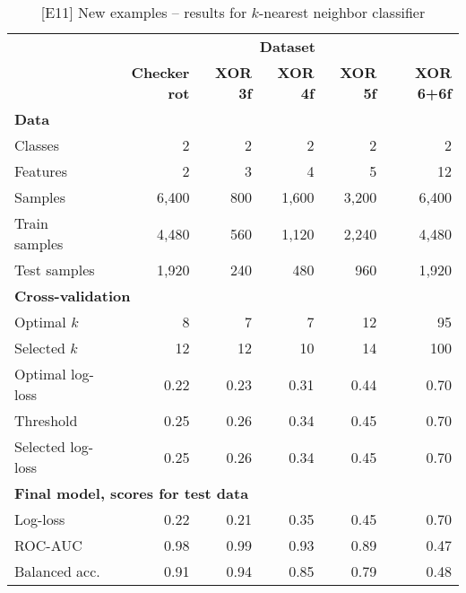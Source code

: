 %
\begin{table}
\caption{[E11]  New examples -- results for $k$-nearest neighbor classifier}
\label{tab_e11}
%
\begin{center}
\small
\begin{tabular}{|lrrrrr|}
\hline
&\multicolumn{5}{c|}{\textbf{\hrulefill\ Dataset \hrulefill}}\\
&\textbf{Checker rot}&\textbf{XOR 3f}&\textbf{XOR 4f}&\textbf{XOR 5f}&\textbf{XOR 6+6f}\\
\multicolumn{6}{|l|}{\textbf{Data}}\\
Classes&2&2&2&2&2\\
Features&2&3&4&5&12\\
Samples&6,400&800&1,600&3,200&6,400\\
Train samples&4,480&560&1,120&2,240&4,480\\
Test samples&1,920&240&480&960&1,920\\
\multicolumn{6}{|l|}{\textbf{Cross-validation}}\\
Optimal $k$&8&7&7&12&95\\
Selected $k$&12&12&10&14&100\\
Optimal log-loss&0.22&0.23&0.31&0.44&0.70\\
Threshold&0.25&0.26&0.34&0.45&0.70\\
Selected log-loss&0.25&0.26&0.34&0.45&0.70\\
\multicolumn{6}{|l|}{\textbf{Final model, scores for test data}}\\
Log-loss&0.22&0.21&0.35&0.45&0.70\\
ROC-AUC&0.98&0.99&0.93&0.89&0.47\\
Balanced acc.&0.91&0.94&0.85&0.79&0.48\\
\hline
\end{tabular}
\end{center}
\end{table}
%
